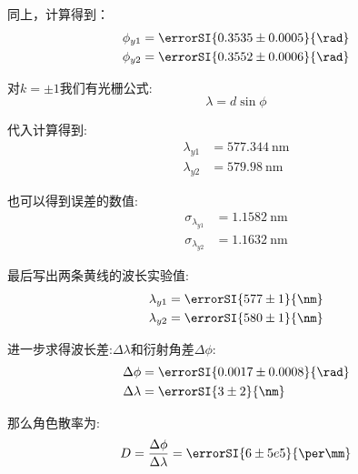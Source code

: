 \documentclass[a4paper]{article}
\begin{document}
同上，计算得到：
$$\begin{aligned}
		\phi_{y1} & =\errorSI{0.3535\pm 0.0005}{\rad} \\
		\phi_{y2} & =\errorSI{0.3552\pm 0.0006}{\rad}
	\end{aligned}$$

对$k=\pm 1$我们有光栅公式:
$$\lambda = d \sin{\phi}$$

代入计算得到:
$$\begin{aligned}
		\lambda_{y1} & =\SI{577.344}{\nm} \\
		\lambda_{y2} & =\SI{579.98}{\nm}
	\end{aligned}$$

也可以得到误差的数值:
$$\begin{aligned}
		\sigma_{\lambda_{y1}} & =\SI{1.1582}{\nm} \\
		\sigma_{\lambda_{y2}} & =\SI{1.1632}{\nm}
	\end{aligned}$$

最后写出两条黄线的波长实验值:
$$\begin{aligned}
		\lambda_{y1} & =\errorSI{577\pm1}{\nm} \\
		\lambda_{y2} & =\errorSI{580\pm1}{\nm}
	\end{aligned}$$

进一步求得波长差:$\Delta\lambda$和衍射角差$\Delta\phi$:
$$\begin{aligned}
		\Delta\phi    & =\errorSI{0.0017\pm0.0008}{\rad} \\
		\Delta\lambda & =\errorSI{3\pm2}{\nm}
	\end{aligned}$$

那么角色散率为:
$$D=\frac{\Delta\phi}{\Delta\lambda}=\errorSI{6\pm5e5}{\per\mm}$$
\end{document}
